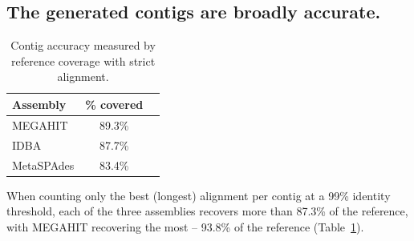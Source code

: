 \documentclass[11pt]{article}
\begin{document}
\subsection*{The generated contigs are broadly accurate.} 



\begin{table}[!h]
\centering
\caption{Contig accuracy measured by reference coverage with strict alignment.}
\begin{tabular}{|l|c|c|}\hline
\textbf{Assembly} & \textbf {\% covered}
  \\ \hline
MEGAHIT & 89.3\% \\ \hline
IDBA & 87.7\% \\ \hline
MetaSPAdes &  83.4\% \\ \hline
\end{tabular}
\label{table:contig-accuracy}
\end{table}

When counting only the best (longest) alignment per contig at a 99\%
identity threshold, each of the three assemblies recovers more than 87.3\% of the
reference, with MEGAHIT recovering the most -- 93.8\% of the reference
(Table~\ref{table:contig-accuracy}).


\newpage
\end{document}

